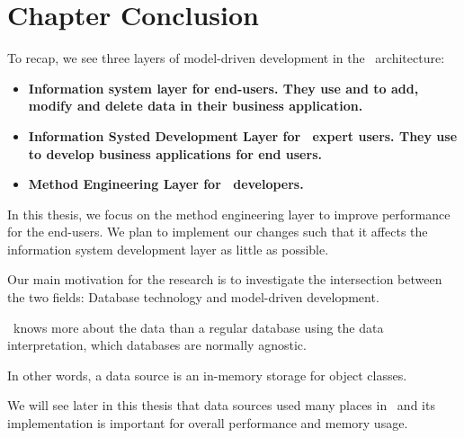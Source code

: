 \section{Chapter Conclusion}
\label{sec:Chapter Conclusion}
To recap, we see three layers of model-driven development in the \gap~architecture:
\begin{itemize}
    \item \bf{Information system layer} for end-users. They use  and  to add, modify and delete data in their business application.
    \item \bf{Information Systed Development Layer} for \gap~expert users. They use  to develop business applications for end users.
    \item \bf{Method Engineering Layer} for \gap~developers. 
\end{itemize}
In this thesis, we focus on the method engineering layer to improve performance for the end-users. We plan to implement our changes such that it affects the information system development layer as little as possible.

Our main motivation for the research is to investigate the intersection between the two fields: Database technology and model-driven development.

\gap~knows more about the data than a regular database using the data interpretation, which databases are normally agnostic.

In other words, a data source is an in-memory storage for object classes.

We will see later in this thesis that data sources used many places in \gap~and its implementation is important for overall performance and memory usage.
